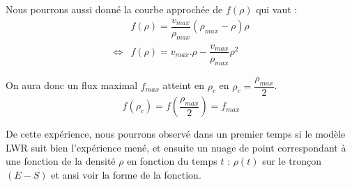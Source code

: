 \documentclass[12pt, openany]{report}
\begin{document}
Nous pourrons aussi donné la courbe approchée de $f(\rho)$ qui vaut :
$$
\begin{array}{ll}
     & f(\rho) = \dfrac{v_{max}}{\rho_{max}}(\rho_{max}-\rho)\rho\\
     \Leftrightarrow & f(\rho)=v_{max}.\rho - \dfrac{v_{max}}{\rho_{max}}\rho^2
\end{array}
$$

On aura donc un flux maximal $f_{max} $ atteint en $\rho_c$ en $\rho_c=\dfrac{\rho_{max}}{2}$.
$$ f(\rho_c)=f(\dfrac{\rho_{max}}{2})=f_{max}$$

De cette expérience, nous pourrons observé dans un premier temps si le modèle LWR suit bien l'expérience mené, et ensuite un nuage de point correspondant à une fonction de la densité $\rho$ en fonction du temps $t$ : $\rho (t)$ sur le tronçon $(E-S)$ et ansi voir la forme de la fonction.
\end{document}
